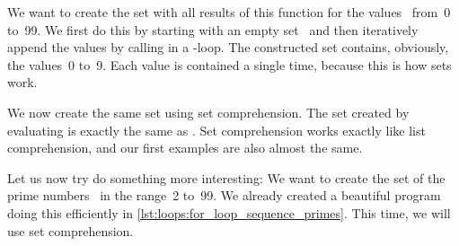 We want to create the set with all results of this function for the values~ from~0 to~99.
We first do this by starting with an empty set~ and then iteratively append the values by calling  in a -loop.
The constructed set contains, obviously, the values~0 to~9.
Each value is contained a single time, because this is how sets work.%
%
\begin{sloppypar}%
We now create the same set using set comprehension.
The set  created by evaluating  is exactly the same as .
Set comprehension works exactly like list comprehension, and our first examples are also almost the same.%
\end{sloppypar}%
%
Let us now try do something more interesting:
We want to create the set  of the prime numbers~\cite{W2024MAWWR:PN,CP2005PNACP,R1994PNACMFF} in the range~2 to~99.
We already created a beautiful program doing this efficiently in \cref{lst:loops:for_loop_sequence_primes}.
This time, we will use set comprehension.


